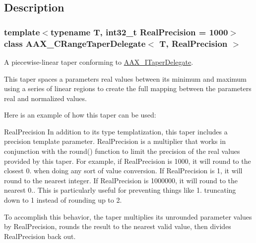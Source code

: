 \subsection{Description}
\subsubsection*{template$<$typename T, int32\+\_\+t Real\+Precision = 1000$>$\newline
class A\+A\+X\+\_\+\+C\+Range\+Taper\+Delegate$<$ T, Real\+Precision $>$}

A piecewise-\/linear taper conforming to \mbox{\hyperlink{a01881}{A\+A\+X\+\_\+\+I\+Taper\+Delegate}}. 

This taper spaces a parameter\textquotesingle{}s real values between its minimum and maximum using a series of linear regions to create the full mapping between the parameter\textquotesingle{}s real and normalized values.

Here is an example of how this taper can be used\+:


\begin{DoxyCode}{0}
\DoxyCodeLine{}
\DoxyCodeLine{\{}
\DoxyCodeLine{\}}
\DoxyCodeLine{}
\DoxyCodeLine{}
\DoxyCodeLine{}
\end{DoxyCode}


\begin{DoxyParagraph}{Real\+Precision}
In addition to its type templatization, this taper includes a precision template parameter. Real\+Precision is a multiplier that works in conjunction with the round() function to limit the precision of the real values provided by this taper. For example, if Real\+Precision is 1000, it will round to the closest 0. when doing any sort of value conversion. If Real\+Precision is 1, it will round to the nearest integer. If Real\+Precision is 1000000, it will round to the nearest 0.. This is particularly useful for preventing things like 1. truncating down to 1 instead of rounding up to 2.
\end{DoxyParagraph}
To accomplish this behavior, the taper multiplies its unrounded parameter values by Real\+Precision, rounds the result to the nearest valid value, then divides Real\+Precision back out.

